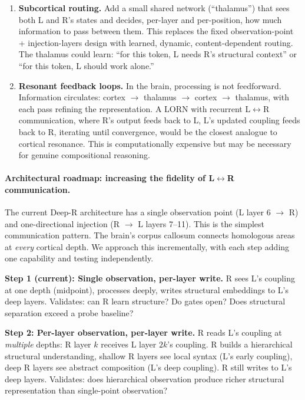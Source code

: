 \documentclass[11pt, a4paper]{article}
\theoremstyle{plain}
\theoremstyle{definition}
\theoremstyle{remark}
\begin{document}
\begin{enumerate}[nosep]
\item \textbf{Subcortical routing.}
Add a small shared network (``thalamus'') that sees both L and R's states and decides, per-layer and per-position, how much information to pass between them.
This replaces the fixed observation-point + injection-layers design with learned, dynamic, content-dependent routing.
The thalamus could learn: ``for this token, L needs R's structural context'' or ``for this token, L should work alone.''

\item \textbf{Resonant feedback loops.}
In the brain, processing is not feedforward.
Information circulates: cortex $\to$ thalamus $\to$ cortex $\to$ thalamus, with each pass refining the representation.
A LORN with recurrent L$\leftrightarrow$R communication, where R's output feeds back to L, L's updated coupling feeds back to R, iterating until convergence, would be the closest analogue to cortical resonance.
This is computationally expensive but may be necessary for genuine compositional reasoning.
\end{enumerate}

\paragraph{Architectural roadmap: increasing the fidelity of L$\leftrightarrow$R communication.}

The current Deep-R architecture has a single observation point (L layer 6 $\to$ R) and one-directional injection (R $\to$ L layers 7--11).
This is the simplest communication pattern.
The brain's corpus callosum connects homologous areas at \emph{every} cortical depth.
We approach this incrementally, with each step adding one capability and testing independently.

\textbf{Step 1 (current): Single observation, per-layer write.}
R sees L's coupling at one depth (midpoint), processes deeply, writes structural embeddings to L's deep layers.
Validates: can R learn structure? Do gates open? Does structural separation exceed a probe baseline?

\textbf{Step 2: Per-layer observation, per-layer write.}
R reads L's coupling at \emph{multiple} depths: R layer $k$ receives L layer $2k$'s coupling.
R builds a hierarchical structural understanding, shallow R layers see local syntax (L's early coupling), deep R layers see abstract composition (L's deep coupling).
R still writes to L's deep layers.
Validates: does hierarchical observation produce richer structural representation than single-point observation?
\end{document}
